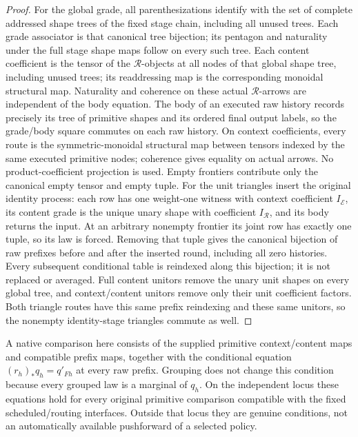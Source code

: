 \documentclass[11pt]{article}
\begin{document}
\begin{proof}
For the global grade, all parenthesizations identify with the set of complete addressed shape trees of the fixed stage chain, including all unused trees. Each grade associator is that canonical tree bijection; its pentagon and naturality under the full stage shape maps follow on every such tree. Each content coefficient is the tensor of the $\mathcal R$-objects at all nodes of that global shape tree, including unused trees; its readdressing map is the corresponding monoidal structural map. Naturality and coherence on these actual $\mathcal R$-arrows are independent of the body equation. The body of an executed raw history records precisely its tree of primitive shapes and its ordered final output labels, so the grade/body square commutes on each raw history. On context coefficients, every route is the symmetric-monoidal structural map between tensors indexed by the same executed primitive nodes; coherence gives equality on actual arrows. No product-coefficient projection is used. Empty frontiers contribute only the canonical empty tensor and empty tuple. For the unit triangles insert the original identity process: each row has one weight-one witness with context coefficient $I_{\mathcal E}$, its content grade is the unique unary shape with coefficient $I_{\mathcal R}$, and its body returns the input. At an arbitrary nonempty frontier its joint row has exactly one tuple, so its law is forced. Removing that tuple gives the canonical bijection of raw prefixes before and after the inserted round, including all zero histories. Every subsequent conditional table is reindexed along this bijection; it is not replaced or averaged. Full content unitors remove the unary unit shapes on every global tree, and context/content unitors remove only their unit coefficient factors. Both triangle routes have this same prefix reindexing and these same unitors, so the nonempty identity-stage triangles commute as well.\end{proof}

A native comparison here consists of the supplied primitive context/content maps and compatible prefix maps, together with the conditional equation $(r_h)_*q_h=q'_{Fh}$ at every raw prefix. Grouping does not change this condition because every grouped law is a marginal of $q_h$. On the independent locus these equations hold for every original primitive comparison compatible with the fixed scheduled/routing interfaces. Outside that locus they are genuine conditions, not an automatically available pushforward of a selected policy.
\end{document}
